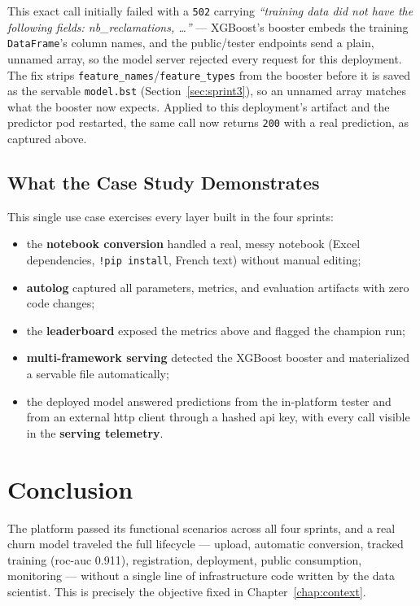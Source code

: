 This exact call initially failed with a \texttt{502} carrying \emph{``training
data did not have the following fields: nb\_reclamations, \ldots''} ---
XGBoost's booster embeds the training \texttt{DataFrame}'s column names,
and the public/tester endpoints send a plain, unnamed array, so the model
server rejected every request for this deployment. The fix strips
\texttt{feature\_names}/\texttt{feature\_types} from the booster before it is
saved as the servable \texttt{model.bst} (Section~\ref{sec:sprint3}), so an
unnamed array matches what the booster now expects. Applied to this
deployment's artifact and the predictor pod restarted, the same call now
returns \texttt{200} with a real prediction, as captured above.


\subsection{What the Case Study Demonstrates}
This single use case exercises every layer built in the four sprints:
\begin{itemize}[leftmargin=1.4em]
  \item the \textbf{notebook conversion} handled a real, messy notebook
        (Excel dependencies, \texttt{!pip install}, French text) without
        manual editing;
  \item \textbf{autolog} captured all parameters, metrics, and evaluation
        artifacts with zero code changes;
  \item the \textbf{leaderboard} exposed the metrics above and flagged the
        champion run;
  \item \textbf{multi-framework serving} detected the XGBoost booster and
        materialized a servable file automatically;
  \item the deployed model answered predictions from the in-platform tester
        and from an external \gls{http} client through a hashed \gls{api}
        key, with every call visible in the \textbf{serving telemetry}.
\end{itemize}

\section{Conclusion}
The platform passed its functional scenarios across all four sprints, and a
real churn model traveled the full lifecycle --- upload, automatic conversion,
tracked training (\gls{roc}-\gls{auc} 0.911), registration, deployment, public
consumption, monitoring --- without a single line of infrastructure code
written by the data scientist. This is precisely the objective fixed in
Chapter~\ref{chap:context}.
